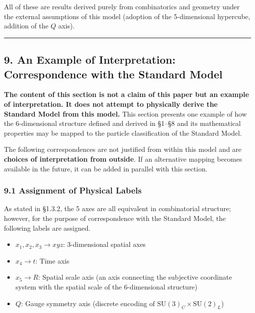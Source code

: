 \documentclass[
  a4paper,11pt]{article}
\providecommand{\tightlist}{%
  \setlength{\itemsep}{0pt}\setlength{\parskip}{0pt}}
\theoremstyle{definition}
\theoremstyle{remark}
\begin{document}
All of these are results derived purely from combinatorics and geometry
under the external assumptions of this model (adoption of the
5-dimensional hypercube, addition of the \(Q\) axis).

\begin{center}\rule{0.5\linewidth}{0.5pt}\end{center}

\subsection{9. An Example of Interpretation: Correspondence with the
Standard
Model}\label{an-example-of-interpretation-correspondence-with-the-standard-model}

\textbf{The content of this section is not a claim of this paper but an
example of interpretation. It does not attempt to physically derive the
Standard Model from this model.} This section presents one example of
how the 6-dimensional structure defined and derived in §1--§8 and its
mathematical properties may be mapped to the particle classification of
the Standard Model.

The following correspondences are not justified from within this model
and are \textbf{choices of interpretation from outside}. If an
alternative mapping becomes available in the future, it can be added in
parallel with this section.

\subsubsection{9.1 Assignment of Physical
Labels}\label{assignment-of-physical-labels}

As stated in §1.3.2, the 5 axes are all equivalent in combinatorial
structure; however, for the purpose of correspondence with the Standard
Model, the following labels are assigned.

\begin{itemize}
\tightlist
\item
  \(x_1, x_2, x_3 \to xyz\): 3-dimensional spatial axes
\item
  \(x_4 \to t\): Time axis
\item
  \(x_5 \to R\): Spatial scale axis (an axis connecting the subjective
  coordinate system with the spatial scale of the 6-dimensional
  structure)
\item
  \(Q\): Gauge symmetry axis (discrete encoding of
  \(\mathrm{SU}(3)_C \times \mathrm{SU}(2)_L\))
\end{itemize}
\end{document}
